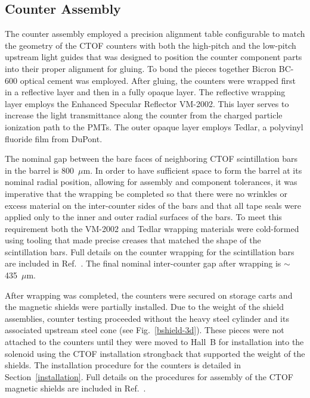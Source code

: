 \documentclass[3p,times,twocolumn]{elsarticle}
\begin{document}
\subsection{Counter Assembly}
\label{assembly}
           
The counter assembly employed a precision alignment table configurable to match the geometry of the CTOF
counters with both the high-pitch and the low-pitch upstream light guides that was designed to position the
counter component parts into their proper alignment for gluing. To bond the pieces together Bicron BC-600
optical cement was employed. After gluing, the counters were wrapped first in a reflective layer and then
in a fully opaque layer. The reflective wrapping layer employs the Enhanced Specular Reflector VM-2002. This
layer serves to increase the light transmittance along the counter from the charged particle ionization path to
the PMTs. The outer opaque layer employs Tedlar, a polyvinyl fluoride film from DuPont.

The nominal gap between the bare faces of neighboring CTOF scintillation bars in the barrel is 800~$\mu$m.
In order to have sufficient space to form the barrel at its nominal radial position, allowing for assembly and
component tolerances, it was imperative that the wrapping be completed so that there were no wrinkles or
excess material on the inter-counter sides of the bars and that all tape seals were applied only to the inner
and outer radial surfaces of the bars. To meet this requirement both the VM-2002 and Tedlar wrapping
materials were cold-formed using tooling that made precise creases that matched the shape of the scintillation
bars. Full details on the counter wrapping for the scintillation bars are included in Ref.~\cite{ctof-wrapping}.
The final nominal inter-counter gap after wrapping is $\sim$435~$\mu$m.

After wrapping was completed, the counters were secured on storage carts and the magnetic shields were
partially installed. Due to the weight of the shield assemblies, counter testing proceeded without the heavy
steel cylinder and its associated upstream steel cone (see Fig.~\ref{bshield-3d}). These pieces were not
attached to the counters until they were moved to Hall~B for installation into the solenoid using the CTOF
installation strongback that supported the weight of the shields. The installation procedure for the counters
is detailed in Section~\ref{installation}. Full details on the procedures for assembly of the CTOF magnetic
shields are included in Ref.~\cite{ctof-sh-assy}.
\end{document}
